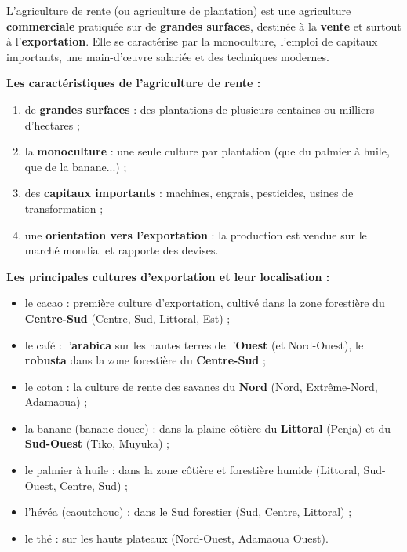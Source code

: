 \documentclass[11pt]{article}
\newcommand{\cle}[1]{{\popxbold\color{popdark}#1}}
\begin{document}
\begin{definition}
L'\cle{agriculture de rente} (ou agriculture de plantation) est une agriculture \textbf{commerciale} pratiquée sur de \textbf{grandes surfaces}, destinée à la \textbf{vente} et surtout à l'\textbf{exportation}. Elle se caractérise par la monoculture, l'emploi de capitaux importants, une main-d'œuvre salariée et des techniques modernes.
\end{definition}

\textbf{Les caractéristiques de l'agriculture de rente :}
\begin{enumerate}
\item de \textbf{grandes surfaces} : des plantations de plusieurs centaines ou milliers d'hectares ;
\item la \textbf{monoculture} : une seule culture par plantation (que du palmier à huile, que de la banane...) ;
\item des \textbf{capitaux importants} : machines, engrais, pesticides, usines de transformation ;
\item une \textbf{orientation vers l'exportation} : la production est vendue sur le marché mondial et rapporte des devises.
\end{enumerate}

\textbf{Les principales cultures d'exportation et leur localisation :}

\begin{itemize}
\item le \cle{cacao} : première culture d'exportation, cultivé dans la zone forestière du \textbf{Centre-Sud} (Centre, Sud, Littoral, Est) ;
\item le \cle{café} : l'\textbf{arabica} sur les hautes terres de l'\textbf{Ouest} (et Nord-Ouest), le \textbf{robusta} dans la zone forestière du \textbf{Centre-Sud} ;
\item le \cle{coton} : la culture de rente des savanes du \textbf{Nord} (Nord, Extrême-Nord, Adamaoua) ;
\item la \cle{banane} (banane douce) : dans la plaine côtière du \textbf{Littoral} (Penja) et du \textbf{Sud-Ouest} (Tiko, Muyuka) ;
\item le \cle{palmier à huile} : dans la zone côtière et forestière humide (Littoral, Sud-Ouest, Centre, Sud) ;
\item l'\cle{hévéa} (caoutchouc) : dans le Sud forestier (Sud, Centre, Littoral) ;
\item le \cle{thé} : sur les hauts plateaux (Nord-Ouest, Adamaoua Ouest).
\end{itemize}
\end{document}
